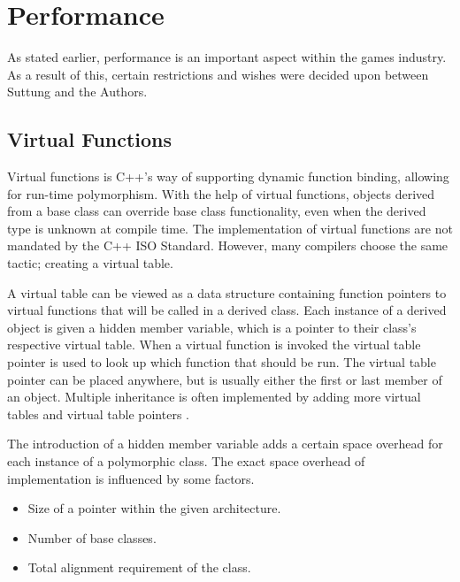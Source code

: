 
\section{Performance}
As stated earlier, performance is an important aspect within the games industry.
As a result of this, certain restrictions and wishes were decided upon between Suttung and the Authors.

\subsection{Virtual Functions}
\label{subsec:requirements_performance_virtual_functions}
Virtual functions is C++'s way of supporting dynamic function binding, allowing for run-time polymorphism.
With the help of virtual functions, objects derived from a base class can override base class functionality,
even when the derived type is unknown at compile time.
The implementation of virtual functions are not mandated by the C++ ISO Standard.
However, many compilers choose the same tactic; creating a virtual table\cite{wikipedia_virtual_method_table}\cite[p. 140]{game_engine_architecture}.

A virtual table can be viewed as a data structure containing function pointers to virtual functions that will be called in a derived class.
Each instance of a derived object is given a hidden member variable, which is a pointer to their class's respective virtual table.
When a virtual function is invoked the virtual table pointer is used to look up which function that should be run.
The virtual table pointer can be placed anywhere, but is usually either the first or last member of an object.
Multiple inheritance is often implemented by adding more virtual tables and virtual table pointers\cite{codersource_virtual_functions}
\cite[31:12]{andrei_alexandrescu_quick_code_quickly}.

The introduction of a hidden member variable adds a certain space overhead for each instance of a polymorphic class.
The exact space overhead of implementation is influenced by some factors.
\begin{itemize}
    \item
    Size of a pointer within the given architecture.

    \item
    Number of base classes.

    \item
    Total alignment requirement of the class.
\end{itemize}

